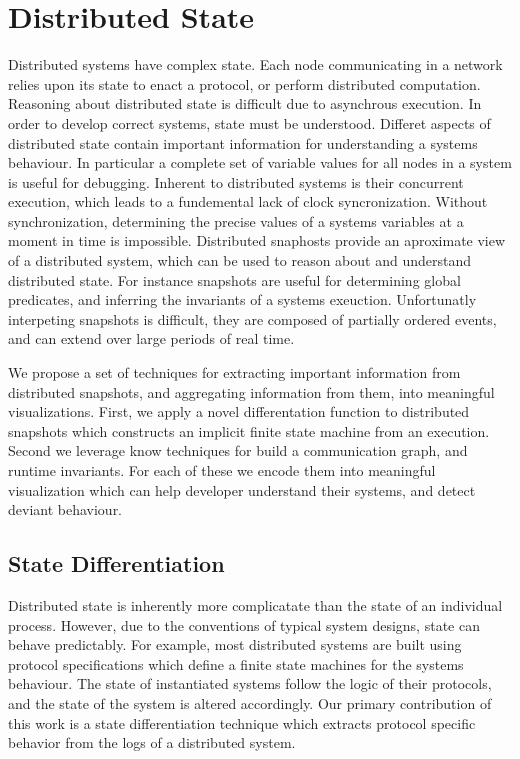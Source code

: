 \section{Distributed State}
\label{sec:distributed-state}


Distributed systems have complex state. Each node communicating in a network
relies upon its state to enact a protocol, or perform distributed computation.
Reasoning about distributed state is difficult due to asynchrous execution. In
order to develop correct systems, state must be understood. Differet aspects of
distributed state contain important information for understanding a systems
behaviour. In particular a complete set of variable values for all nodes in a
system is useful for debugging. Inherent to distributed systems is their
concurrent execution, which leads to a fundemental lack of clock
syncronization. Without synchronization, determining the precise values of a
systems variables at a moment in time is impossible. Distributed snaphosts
provide an aproximate view of a distributed system, which can be used to reason
about and understand distributed state. For instance snapshots are useful for
determining global predicates, and inferring the invariants of a systems
exeuction. Unfortunatly interpeting snapshots is difficult, they are composed
of partially ordered events, and can extend over large periods of real time.

We propose a set of techniques for extracting important information from
distributed snapshots, and aggregating information from them, into meaningful
visualizations. First, we apply a novel differentation function to distributed
snapshots which constructs an implicit finite state machine from an execution.
Second we leverage know techniques for build a communication graph, and runtime
invariants. For each of these we encode them into meaningful visualization
which can help developer understand their systems, and detect deviant
behaviour.

\subsection{State Differentiation}

Distributed state is inherently more complicatate than the state of an
individual process. However, due to the conventions of typical system designs,
state can behave predictably. For example, most distributed systems are built
using protocol specifications which define a finite state machines for the
systems behaviour. The state of instantiated systems follow the logic of their
protocols, and the state of the system is altered accordingly. Our primary
contribution of this work is a state differentiation technique which extracts
protocol specific behavior from the logs of a distributed system.

